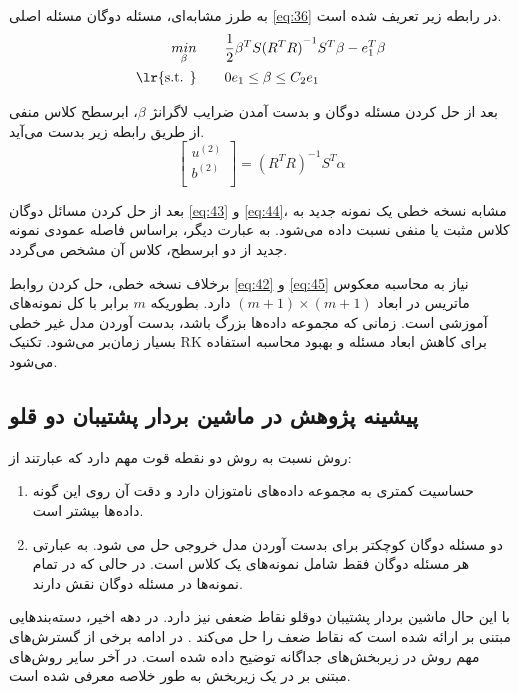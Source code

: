 به طرز مشابه‌ای، مسئله دوگان مسئله اصلی \ref{eq:36} در رابطه زیر تعریف شده است.
\begin{equation}
\begin{split}
\mathop{{ min}}\limits_{\beta} \qquad & \frac{1}{2}{{\beta }^{T}}S{{({{R}^{T}}R)}^{-1}}{{S}^{T}}\beta -e_{1}^{T}\beta  \\
\textrm{\lr{s.t. }} \qquad & 0{{e}_{1}}\le \beta \le {{C}_{2}}{{e}_{1}}
\end{split}
\label{eq:44}
\end{equation}

بعد از حل کردن مسئله دوگان و بدست آمدن ضرایب لاگرانژ $\beta$، ابرسطح کلاس منفی از طریق رابطه زیر بدست می‌آید.
\begin{equation}
\left[ \begin{matrix}
{{u}^{(2)}} \\
{{b}^{(2)}} \\
\end{matrix}\right]= {{({{R}^{T}}R)}^{-1}}{{S}^{T}}\alpha
\label{eq:45}
\end{equation}

بعد از حل کردن مسائل دوگان \ref{eq:43} و \ref{eq:44}، مشابه نسخه خطی یک نمونه جدید به کلاس مثبت یا منفی نسبت داده می‌شود. به عبارت دیگر، براساس فاصله عمودی نمونه جدید از دو ابرسطح، کلاس آن مشخص می‌گردد. 

برخلاف نسخه خطی، حل کردن روابط \ref{eq:42} و \ref{eq:45} نیاز به محاسبه معکوس ماتریس در ابعاد $(m + 1) \times (m + 1)$ دارد. بطوریکه  $m$ برابر با کل نمونه‌های آموزشی است. زمانی که مجموعه داده‌ها بزرگ باشد، بدست آوردن مدل غیر خطی بسیار زمان‌بر می‌شود. تکنیک \gls{RK} \cite{mang2001} برای کاهش ابعاد مسئله و بهبود محاسبه استفاده می‌شود.

\subsection{پیشینه پژوهش در ماشین بردار پشتیبان دو قلو}\label{sec:2:2:3}
روش  نسبت به روش  دو نقطه قوت مهم دارد که عبارتند از:
\begin{enumerate}
	\item 	حساسیت کمتری به مجموعه داده‌های نامتوزان دارد و دقت آن روی این گونه داده‌ها بیشتر است.
	\item دو مسئله دوگان کوچکتر برای بدست آوردن مدل خروجی حل می شود. به عبارتی هر مسئله دوگان فقط شامل نمونه‌های یک کلاس است. در حالی که در  تمام نمونه‌ها در مسئله دوگان نقش دارند.
\end{enumerate}

با این حال ماشین بردار پشتیبان دوقلو نقاط ضعفی نیز دارد. در دهه اخیر، دسته‌بند‌هایی مبتنی بر  ارائه شده است که نقاط ضعف  را حل می‌کند \cite{ding2014,ding2017,huang2018}. در ادامه برخی از گسترش‌های مهم روش  در زیربخش‌های جداگانه توضیح داده شده است. در آخر سایر روش‌های مبتنی بر  در یک زیربخش به طور خلاصه معرفی شده است.

